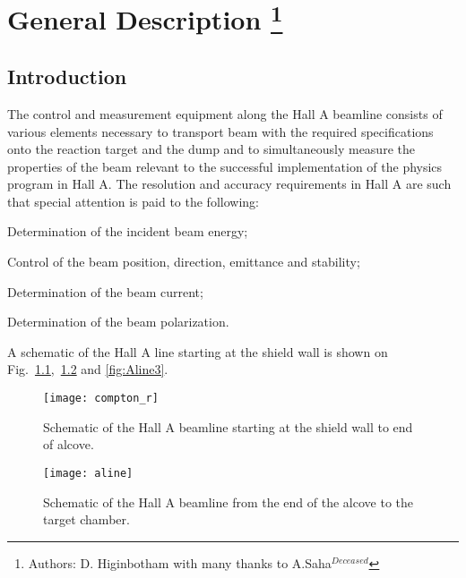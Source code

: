 \chapter[General Description]{General Description
\footnote{Authors: D. Higinbotham  with many thanks to A.Saha$^{Deceased}$}}
\section{Introduction}
\label{sec:beam-intro}

The control and measurement equipment along the Hall A beamline consists of 
various elements necessary to transport beam with the required specifications 
onto the reaction target and the dump and to simultaneously measure the 
properties of the beam relevant to the successful implementation of the 
physics program in Hall A.  The resolution and accuracy requirements in Hall 
A are such that special attention is paid to the following:
\begin{list}{.~}{\setlength{\itemsep}{-0.15cm}}
  \item Determination of the incident beam energy;
  \item Control of the beam position, direction, emittance and stability;
  \item Determination of the beam current;
  \item Determination of the beam polarization.
\end{list}

A schematic of the Hall A line starting at the shield wall is
shown on Fig.~\ref{fig:Aline1},~\ref{fig:Aline2} and \ref{fig:Aline3}. 

\begin{figure}
\begin{center}
\texttt{[image: compton\_r]}
\caption[Beamline: Hall A Beamline Overview]{Schematic of the Hall A beamline
starting at the shield wall to end of alcove.}
\label{fig:Aline1}
\end{center}
\end{figure}

\begin{figure}
\begin{center}
\texttt{[image: aline]}
\caption[Beamline: Hall A Beamline Overview]{Schematic of the Hall A beamline
from the end of the alcove to the target chamber.}
\label{fig:Aline2}
\end{center}
\end{figure}

